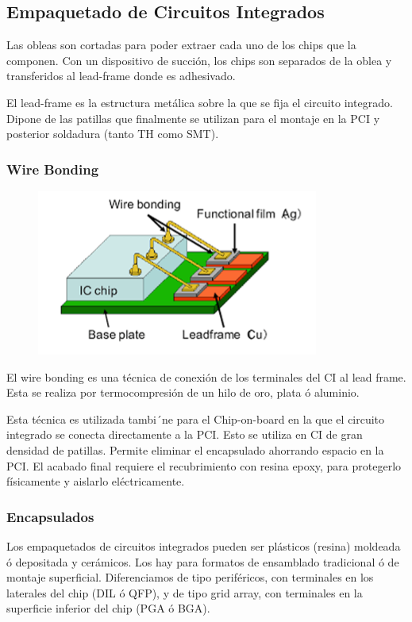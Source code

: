 \subsection{Empaquetado de Circuitos Integrados}

Las obleas son cortadas para poder extraer cada uno de los chips que la componen. Con un dispositivo de succión, los chips son separados de la oblea y transferidos al lead-frame donde es adhesivado.

El lead-frame es la estructura metálica sobre la que se fija el circuito integrado. Dipone de las patillas que finalmente se utilizan para el montaje en la PCI y posterior soldadura (tanto TH como SMT).

\subsubsection{Wire Bonding}

\begin{figure}[H]
    \centering
    \includegraphics[width=0.5\linewidth]{Imagenes/Tecnologia de CI - Wire Bonding.png}
\end{figure}

El wire bonding es una técnica de conexión de los terminales del CI al lead frame. Esta se realiza por termocompresión de un hilo de oro, plata ó aluminio.

Esta técnica es utilizada tambi´ne para el Chip-on-board en la que el circuito integrado se conecta directamente a la PCI. Esto se utiliza en CI de gran densidad de patillas. Permite eliminar el encapsulado ahorrando espacio en la PCI. El acabado final requiere el recubrimiento con resina epoxy, para protegerlo físicamente y aislarlo eléctricamente.

\subsubsection{Encapsulados}
 Los empaquetados de circuitos integrados pueden ser plásticos (resina) moldeada ó depositada y cerámicos. Los hay para formatos de ensamblado tradicional ó de montaje superficial. Diferenciamos de tipo periféricos, con terminales en los laterales del chip (DIL ó QFP), y de tipo grid array, con terminales en la superficie inferior del chip (PGA ó BGA).
